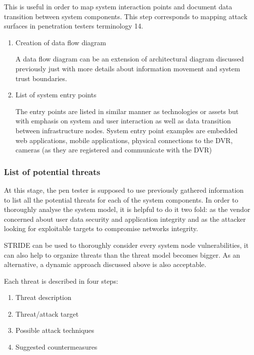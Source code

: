 	This is useful in order to map system interaction points and document data transition between system components. This step corresponds to mapping attack surfaces in penetration testers terminology {14}.
	
	\begin{enumerate}
		\item Creation of data flow diagram
		
		A data flow diagram can be an extension of architectural diagram discussed previously just with more details about information movement and system trust boundaries.
		
		\item List of system entry points
		
		The entry points are listed in similar manner as technologies or assets but with emphasis on system and user interaction as well as data transition between infrastructure nodes.
		\newline
		System entry point examples are embedded web applications, mobile applications, physical connections to the DVR, cameras (as they are registered and communicate with the DVR)
	\end{enumerate}
	
	\subsubsection{List of potential threats}
	
	At this stage, the pen tester is supposed to use previously gathered information to list all the potential threats for each of the system components. In order to thoroughly analyse the system model, it is helpful to do it two fold: as the vendor concerned about user data security and application integrity and as the attacker looking for exploitable targets to compromise networks integrity.
	
	STRIDE can be used to thoroughly consider every system node vulnerabilities, it can also help to organize threats than the threat model becomes bigger. As an alternative, a dynamic approach discussed above is also acceptable.
	
	Each threat is described in four steps:
	\begin{enumerate}
		\item Threat description
		\item Threat/attack target
		\item Possible attack techniques
		\item Suggested countermeasures
	\end{enumerate}

